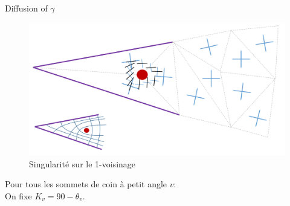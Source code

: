 \begin{frame}{Diffusion of $\gamma$}

    \begin{minipage}{0.59\textwidth}
    \begin{figure}
      \centering
      \includegraphics[width=0.79\linewidth]{img/cadff/sharp1}
      \caption{Singularité sur le 1-voisinage}
    \end{figure}
    \end{minipage}%
    \begin{minipage}{0.39\textwidth}
        Pour tous les sommets de coin à petit angle \(v\):\\
        On fixe \(K_v = 90 - \theta_v\).
        

\end{minipage}
\end{frame}
